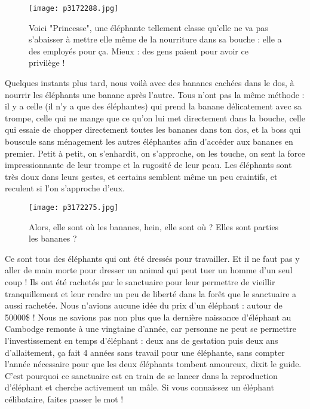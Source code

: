 \documentclass{book}
\begin{document}
\begin{figure}[h]
\centering
\texttt{[image: p3172288.jpg]}
\caption*{Voici "Princesse", une éléphante tellement classe qu'elle ne va pas s'abaisser à mettre elle même de la nourriture dans sa bouche : elle a des employés pour ça. Mieux : des gens paient pour avoir ce privilège !}
\end{figure}

Quelques instants plus tard, nous voilà avec des bananes cachées dans le dos, à nourrir les éléphants une banane après l'autre. Tous n'ont pas la même méthode : il y a celle (il n'y a que des éléphantes) qui prend la banane délicatement avec sa trompe, celle qui ne mange que ce qu'on lui met directement dans la bouche, celle qui essaie de chopper directement toutes les bananes dans ton dos, et la boss qui bouscule sans ménagement les autres éléphantes afin d'accéder aux bananes en premier. Petit à petit, on s’enhardit, on s'approche, on les touche, on sent la force impressionnante de leur trompe et la rugosité de leur peau. Les éléphants sont très doux dans leurs gestes, et certains semblent même un peu craintifs, et reculent si l'on s'approche d'eux.


\begin{figure}[h]
\centering
\texttt{[image: p3172275.jpg]}
\caption*{Alors, elle sont où les bananes, hein, elle sont où ? Elles sont parties les bananes ?}
\end{figure}

Ce sont tous des éléphants qui ont été dressés pour travailler. Et il ne faut pas y aller de main morte pour dresser un animal qui peut tuer un homme d'un seul coup ! Ils ont été rachetés par le sanctuaire pour leur permettre de vieillir tranquillement et leur rendre un peu de liberté dans la forêt que le sanctuaire a aussi rachetée. Nous n'avions aucune idée du prix d'un éléphant : autour de 50000\$ ! Nous ne savions pas non plus que la dernière naissance d'éléphant au Cambodge remonte à une vingtaine d'année, car personne ne peut se permettre l'investissement en temps d'éléphant : deux ans de gestation puis deux ans d'allaitement, ça fait 4 années sans travail pour une éléphante, sans compter l'année nécessaire pour que les deux éléphants tombent amoureux, dixit le guide. C'est pourquoi ce sanctuaire est en train de se lancer dans la reproduction d'éléphant et cherche activement un mâle. Si vous connaissez un éléphant célibataire, faites passer le mot !
\end{document}

